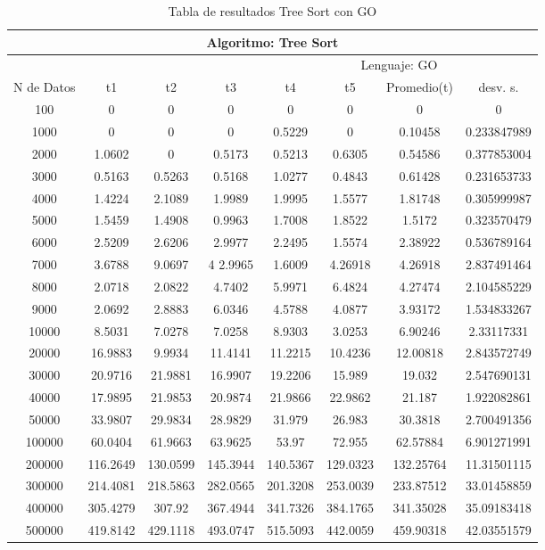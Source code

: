 \documentclass{article}
\begin{document}
	\begin{table}[]
        \begin{tabular}{|c|c|c|c|c|c|c|c| }
            \hline
            \multicolumn{8}{|c|}{Algoritmo: Tree Sort} \\ \hline
            \multicolumn{4}{|c|}{} & \multicolumn{4}{c|}{Lenguaje: GO} \\ \hline
              N de Datos &     t1    &  t2         &  t3          &   t4        &    t5     &   Promedio(t)       & desv. s. \\ \hline
100	    &0	    &0	    &0	        &0	    &0	    &0	      &0              \\ \hline
1000	&0	    &0	    &0	        & 0.5229&0	    &0.10458  &0.233847989     \\ \hline
2000	&1.0602	&0	    & 0.5173	&0.5213	&0.6305	&0.54586  &0.377853004\\ \hline
3000	&0.5163	&0.5263	& 0.5168	&1.0277	&0.4843	&0.61428  &0.231653733\\ \hline
4000	&1.4224	&2.1089	& 1.9989	&1.9995	&1.5577	&1.81748  &0.305999987\\ \hline
5000	&1.5459	&1.4908	& 0.9963	&1.7008	&1.8522	&1.5172	  &0.323570479\\ \hline
6000	&2.5209	&2.6206	& 2.9977	&2.2495	&1.5574	&2.38922  &0.536789164\\ \hline
7000	&3.6788	&9.0697	& 4	2.9965	&1.6009	&4.26918&4.26918    &2.837491464\\ \hline
8000	&2.0718	&2.0822	& 4.7402	&5.9971	&6.4824	&4.27474	&2.104585229\\ \hline
9000	&2.0692	&2.8883	& 6.0346	&4.5788	&4.0877	&3.93172	&1.534833267\\ \hline
10000	&8.5031	&7.0278	& 7.0258	&8.9303	&3.0253	&6.90246	&2.33117331\\ \hline
20000	&16.9883&	9.9934	& 11.4141	&11.2215	&10.4236	&12.00818	&2.843572749\\ \hline
30000	&20.9716&	21.9881	& 16.9907	&19.2206	&15.989	    &19.032	    &2.547690131\\ \hline
40000	&17.9895&	21.9853	& 20.9874	&21.9866	&22.9862	&21.187	    &1.922082861\\ \hline
50000	&33.9807&	29.9834	& 28.9829	&31.979	    &26.983	    &30.3818	&2.700491356\\ \hline
100000	&60.0404&	61.9663	& 63.9625	&53.97	    &72.955	    &62.57884	&6.901271991\\ \hline
200000	&116.2649&	130.0599&	145.3944 &140.5367	&129.0323	&132.25764	&11.31501115\\ \hline
300000	&214.4081&	218.5863&	282.0565 &201.3208	&253.0039	&233.87512	&33.01458859\\ \hline
400000	&305.4279&	307.92	& 367.4944	 &341.7326	&384.1765	&341.35028	&35.09183418\\ \hline
500000	&419.8142&	429.1118&	493.0747 &515.5093	&442.0059	&459.90318  & 42.03551579\\ \hline


       \end{tabular}
       \caption{Tabla de resultados Tree Sort con GO}
        \label{tab:treeSortC}
   \end{table}
\end{document}
